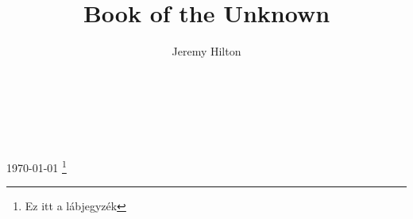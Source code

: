 \documentclass[]{article}
\begin{document}
\title{Book of the Unknown}
\author{Jeremy Hilton}
\maketitle
{}
\frenchspacing
\bigskip
\lipsum[1]\\

{\raggedleft{\noindent{\hulipsum[1]\\}}}
\begin{doublespace}
\blindtext[1]\\
\end{doublespace}


\today
\footnote{Ez itt a lábjegyzék}
\end{document}
